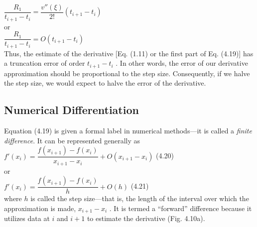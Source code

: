 \documentclass[../main.tex]{subfiles}
\begin{document}
$\dfrac{R_1}{t_{i+1}-t_i}=\dfrac{v''(\xi)}{2!}(t_{i+1}-t_i)$\\

\noindent
or\\

$\dfrac{R_1}{t_{i+1}-t_i}=O(t_{i+1}-t_i)$\\

\noindent
Thus, the estimate of the derivative [Eq. (1.11) or the first part of Eq. (4.19)] has a truncation
error of order $t_{i+1} - t_i$ . In other words, the error of our derivative approximation
should be proportional to the step size. Consequently, if we halve the step size, we would
expect to halve the error of the derivative.\\

\subsection{Numerical Differentiation}
\noindent
Equation (4.19) is given a formal label in numerical methods---it is called a \emph{finite difference}.
It can be represented generally as\\

$f'(x_i)=\dfrac{f(x_{i+1})-f(x_i)}{x_{i+1}-x_i} + O(x_{i+1}-x_i)$
\hfill
(4.20)\\

\noindent
or\\

$f'(x_i)=\dfrac{f(x_{i+1})-f(x_i)}{h} + O(h)$
\hfill
(4.21)\\

\noindent
where $h$ is called the step size---that is, the length of the interval over which the approximation
is made, $x_{i+1} - x_i$ . It is termed a ``forward'' difference because it utilizes data at $i$
and $i + 1$ to estimate the derivative (Fig. 4.10a).\\
\newpage
\end{document}
